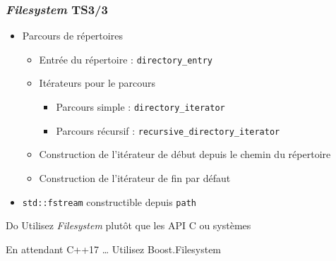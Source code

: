 \documentclass[C++.tex]{subfiles}
\begin{document}
\begin{frame}[fragile]
	\frametitle{\textit{Filesystem} TS\titlehfill{}3/3}
	\begin{itemize}
		\item Parcours de répertoires
		\begin{itemize}
			\item Entrée du répertoire : \lstinline|directory_entry|
			\item Itérateurs pour le parcours
			\begin{itemize}
				\item Parcours simple : \lstinline|directory_iterator|
				\item Parcours récursif : \lstinline|recursive_directory_iterator|
			\end{itemize}
			\item Construction de l'itérateur de début depuis le chemin du répertoire
			\item Construction de l'itérateur de fin par défaut
		\end{itemize}
		\item \lstinline|std::fstream| constructible depuis \lstinline|path|
	\end{itemize}

	\begin{exampleblock}{Do}
		Utilisez \textit{Filesystem} plutôt que les API C ou systèmes
	\end{exampleblock}

	\begin{block}{En attendant C++17 \ldots}
		Utilisez Boost.Filesystem

	\end{block}
\end{frame}
\end{document}
